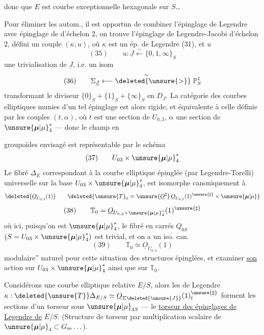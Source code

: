 
donc que $E$ est  courbe exceptionnelle hexagonale sur $S$\ldots

Pour éliminer les autom., il est opportun de combiner l'épinglage de Legendre avec épinglage de  d'échelon $2$, on trouve l'épinglage de Legendre-Jacobi d'échelon $2$, défini  un couple $(\kappa,u)$, où $\kappa$ est un ép. de Legendre (31), et  $u$
\[
(35)\qquad u:\underline{J}\xleftarrow{\sim}\{0,1,\infty\}_S
\]
une trivialisation de $\underline{J}$, i.e. un isom
\[
(36)\qquad\Sigma_{\underline{J}}\overset{\sim}{\longleftarrow\deleted{\unsure{>}}}\mathbb{P}^1_S
\]
transformant le diviseur $\{0\}_S+\{1\}_S+\{\infty\}_S$ en $D_{\underline{J}}$. La catégorie des courbes elliptiques munies d'un tel épinglage est alors rigide, et équivalente à celle définie par les couples $(t,\alpha)$, où $t$ est une section de $U_{0,3}$, $\alpha$ une section de $\unsure{\boldsymbol{\mu}|\mu}_4^*$ --- donc le  champ en


groupoïdes envisagé est représentable par le schéma
\[
(37)\qquad U_{03}\times\unsure{\boldsymbol{\mu}|\mu}_4^*
\]
Le fibré $\Delta_E$ correspondant à la courbe elliptique épinglée (par Legendre-Torelli) universelle sur la base $U_{03}\times\unsure{\boldsymbol{\mu}|\mu}_4^*$, est isomorphe canoniquement à
\[
\deleted{\underline{O}_{U_{0,3}}(1)}\qquad\deleted{\unsure{T}_0=\unsure{\underline{O}^{\sharp}}\,\underline{O}_{U_{0,3}}(1)^{\unsure{\sharp}}\times\unsure{\boldsymbol{\mu}|\mu}}
\]
\[
(38)\qquad\mathbb{T}_0=\underline{O}_{U_{0,3}\times\unsure{\boldsymbol{\mu}|\mu}_4^*}(1)^{\unsure{\sharp}}
\]
où ici, puisqu'on est  $\unsure{\boldsymbol{\mu}|\mu}_4^*$, le fibré en carrés $Q_{0S}$ $(S=U_{03}\times\unsure{\boldsymbol{\mu}|\mu}_4^*)$ est trivial, et on a un iso. can.
\[
(39)\qquad\mathbb{T}_0\simeq\underline{O}_{U_{0,3}}(1)
\]
 modulaire'' naturel pour cette situation des  structures épinglées, et examiner \uline{son} action sur $U_{03}\times\unsure{\boldsymbol{\mu}|\mu}_4^*$ ainsi que sur $\mathbb{T}_0$.


Considérons une courbe elliptique relative $E/S$, alors les  de Legendre $\kappa:\deleted{\unsure{T}}\Delta_{E/S}\simeq\underline{O}_{\Sigma\deleted{\unsure{J}}}(1)_t^{\unsure{\sharp}}$ forment les sections d'un torseur sous $\unsure{\boldsymbol{\mu}|\mu}_{4S}$ --- le \uline{torseur des épinglages de Legendre de} $E/S$. (Structure de torseur par multiplication scalaire de $\unsure{\boldsymbol{\mu}|\mu}_4\subset G_m\ldots$).

